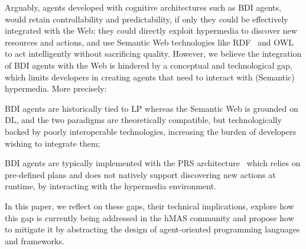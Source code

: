\documentclass[
]{ceurart}
\begin{document}
Arguably,
agents developed with cognitive architectures
such as \ac{BDI} agents,
would retain controllability and predictability,
if only they could be effectively integrated with the Web:
they could directly exploit hypermedia to discover new resources and actions,
and use Semantic Web technologies like \ac{RDF}~\cite{RDF_Concepts_W3C:14} and \ac{OWL}~\cite{OWL_Syntax_W3C:12}
to act intelligently without sacrificing quality.
%
However,
we believe
the integration of \ac{BDI} agents with the Web
is hindered by a conceptual and technological gap,
which limits developers in creating agents that need to interact with (Semantic) hypermedia.
%
More precisely:
\begin{enumerate*}[label=\textbf{(G\arabic*)}]
  \item\label{gap:logic}
  \ac{BDI} agents are historically tied to \ac{LP}
  whereas the Semantic Web is grounded on \ac{DL},
  and the two paradigms are theoretically compatible,
  but technologically backed by poorly interoperable technologies,
  increasing the burden of developers wishing to integrate them;

  \item\label{gap:open-world}
  \ac{BDI} agents are typically implemented with the \ac{PRS} architecture~\cite{georgeff1986pieee}
  which relies on pre-defined plans and does not natively support discovering new actions at runtime,
  by interacting with the hypermedia environment.
\end{enumerate*}

In this paper,
we reflect on these gaps,
their technical implications, %
explore how this gap is currently being addressed in the \ac{hMAS} community and
propose how to mitigate it by abstracting the design of agent-oriented programming languages and frameworks.
\end{document}
